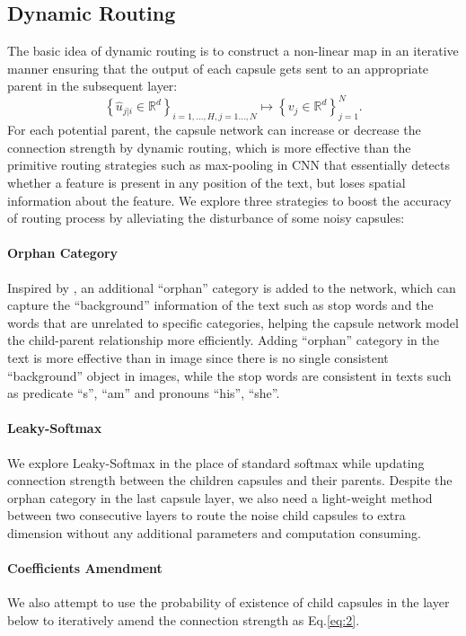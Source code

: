 \documentclass[11pt]{article}
\begin{document}
\subsection{Dynamic Routing}


The basic idea of dynamic routing is to construct a non-linear map in an iterative manner ensuring that the output of each capsule gets sent to an appropriate parent in the subsequent layer: 
\[\left\{\hat u_{j|i}\in \mathbb R^d\right\}_{i=1,\ldots,H,j=1\ldots,N} \mapsto \left\{v_j\in \mathbb R^d\right\}_{j=1}^N.\]
For each potential parent, the capsule network can increase or decrease the connection strength by dynamic routing, which is more effective than the primitive routing strategies such as max-pooling in CNN that  essentially detects whether a feature is present in any position of the text, but loses spatial information about the feature. 
We explore three strategies to boost the accuracy of routing process by alleviating the disturbance of some noisy capsules:
\paragraph{Orphan Category} Inspired by , an additional ``orphan'' category is added to the network, which can capture the ``background'' information of the text such as stop words and the words that are unrelated to specific categories, helping the capsule network model the child-parent relationship more efficiently. Adding ``orphan'' category in the text is more effective than in image since there is no single consistent ``background'' object in images, while the stop words are consistent in texts such as predicate ``s'', ``am'' and pronouns ``his'', ``she''. 

\paragraph{Leaky-Softmax} We explore Leaky-Softmax  in the place of standard softmax while updating connection strength between the children capsules and their parents. 
Despite the orphan category in the last capsule layer, we also need a light-weight method between two consecutive layers to route the noise child capsules to  extra dimension without any additional parameters and computation consuming.

\paragraph{Coefficients Amendment} 
We also attempt to use the probability of existence of child capsules in the layer below to iteratively amend the connection strength as Eq.\ref{eq:2}.
\end{document}
